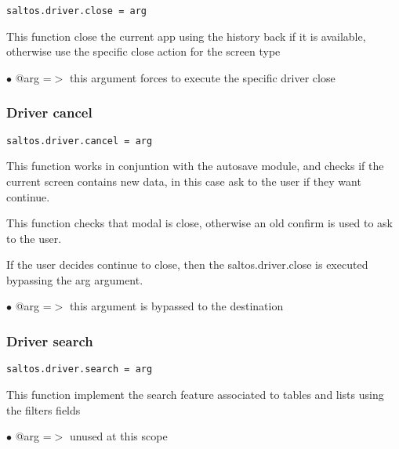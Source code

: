 \documentclass[a4paper]{article}
\begin{document}
\begin{lstlisting}
saltos.driver.close = arg
\end{lstlisting}

This function close the current app using the history back if it is available,
otherwise use the specific close action for the screen type

\begin{compactitem}
\item[\color{myblue}$\bullet$] @arg =$>$ this argument forces to execute the specific driver close
\end{compactitem}

\hypertarget{toc728}{}
\subsubsection{Driver cancel}

\begin{lstlisting}
saltos.driver.cancel = arg
\end{lstlisting}

This function works in conjuntion with the autosave module, and checks if the
current screen contains new data, in this case ask to the user if they want
continue.

This function checks that modal is close, otherwise an old confirm is used
to ask to the user.

If the user decides continue to close, then the saltos.driver.close is executed
bypassing the arg argument.

\begin{compactitem}
\item[\color{myblue}$\bullet$] @arg =$>$ this argument is bypassed to the destination
\end{compactitem}

\hypertarget{toc729}{}
\subsubsection{Driver search}

\begin{lstlisting}
saltos.driver.search = arg
\end{lstlisting}

This function implement the search feature associated to tables and lists
using the filters fields

\begin{compactitem}
\item[\color{myblue}$\bullet$] @arg =$>$ unused at this scope
\end{compactitem}
\end{document}
